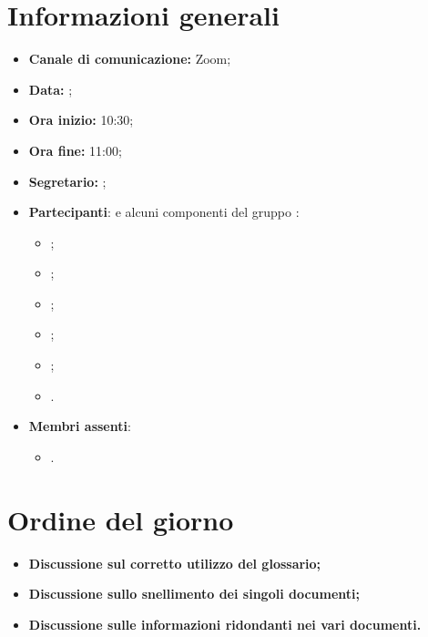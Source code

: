 \section{Informazioni generali}

\begin{itemize}

	\item \textbf{Canale di comunicazione:} Zoom;
	
	\item \textbf{Data:} \DataMeeting{};
	
	\item \textbf{Ora inizio:} 10:30;
	
	\item \textbf{Ora fine:} 11:00;
	
	\item \textbf{Segretario:} \Tommaso{};
	
	\item \textbf{Partecipanti}:  e alcuni componenti del gruppo \Gruppo{}:
	
		\begin{itemize}
			\item \Daniele{};
			\item \Davide{};
			\item \Francesco{};
			\item \Giosue{};
			\item \Lucrezia{};
			\item \Tommaso{}.
			
		\end{itemize}

	\item \textbf{Membri assenti}:
		\begin{itemize}
			\item \Matteo{}.
		\end{itemize}
	\end{itemize}
\section{Ordine del giorno}

\begin{itemize}
	\item\textbf{Discussione sul corretto utilizzo del glossario;}
	\item\textbf{Discussione sullo snellimento dei singoli documenti;}
	\item\textbf{Discussione sulle informazioni ridondanti nei vari documenti.}


\end{itemize}

